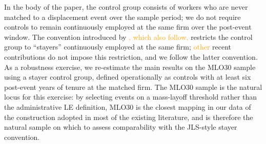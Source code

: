 In the body of the paper, the control group consists of workers who are never matched
to a displacement event over the sample period; we do not require controls to remain
continuously employed at the same firm over the post-event window. The convention
introduced by \citet{Jacobson1993}\textcolor{orange}{, which \citet{Lachowska2020} also follow,} restricts the control group to ``stayers'' continuously
employed at the same firm; \textcolor{orange}{other} recent contributions \citep{Schmieder2020,bertheau_etal_2023}
do not impose this restriction, and we follow the latter convention. As a robustness
exercise, we re-estimate the main results on the MLO30 sample using a stayer control
group, defined operationally as controls with at least six post-event years of tenure
at the matched firm. The MLO30 sample is the natural locus for this exercise: by
selecting events on a mass-layoff threshold rather than the administrative LE definition,
MLO30 is the closest mapping in our data of the construction adopted in most of the
existing literature, and is therefore the natural sample on which to assess comparability
with the JLS-style stayer convention.

